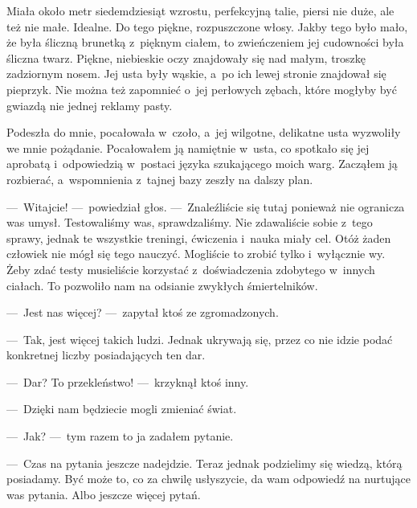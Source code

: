 Miała około metr siedemdziesiąt wzrostu, perfekcyjną talie, piersi nie duże, ale też nie małe. Idealne. Do tego piękne, rozpuszczone włosy. Jakby tego było mało, że była śliczną brunetką z~pięknym ciałem, to zwieńczeniem jej cudowności była śliczna twarz. Piękne, niebieskie oczy znajdowały się nad małym, troszkę zadziornym nosem. Jej usta były wąskie, a~po ich lewej stronie znajdował się pieprzyk. Nie można też zapomnieć o~jej perłowych zębach, które mogłyby być gwiazdą nie jednej reklamy pasty.

Podeszła do mnie, pocałowała w~czoło, a~jej wilgotne, delikatne usta wyzwoliły we mnie pożądanie. Pocałowałem ją namiętnie w~usta, co spotkało się jej aprobatą i~odpowiedzią w~postaci języka szukającego moich warg. Zacząłem ją rozbierać, a~wspomnienia z~tajnej bazy zeszły na dalszy plan.

---~Witajcie! ---~powiedział głos. ---~Znaleźliście się tutaj ponieważ nie ogranicza was umysł. Testowaliśmy was, sprawdzaliśmy. Nie zdawaliście sobie z~tego sprawy, jednak te wszystkie treningi, ćwiczenia i~nauka miały cel. Otóż żaden człowiek nie mógł się tego nauczyć. Mogliście to zrobić tylko i~wyłącznie wy. Żeby zdać testy musieliście korzystać z~doświadczenia zdobytego w~innych ciałach. To pozwoliło nam na odsianie zwykłych śmiertelników.

---~Jest nas więcej? ---~zapytał ktoś ze zgromadzonych.

---~Tak, jest więcej takich ludzi. Jednak ukrywają się, przez co nie idzie podać konkretnej liczby posiadających ten dar.

---~Dar? To przekleństwo! ---~krzyknął ktoś inny.

---~Dzięki nam będziecie mogli zmieniać świat.

---~Jak? ---~tym razem to ja zadałem pytanie.

---~Czas na pytania jeszcze nadejdzie. Teraz jednak podzielimy się wiedzą, którą posiadamy. Być może to, co za chwilę usłyszycie, da wam odpowiedź na nurtujące was pytania. Albo jeszcze więcej pytań.

